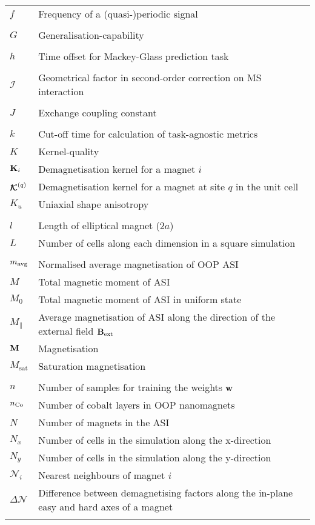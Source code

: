 \begin{longtable}[l]{p{60pt} p{350pt}}
	$f$ & Frequency of a (quasi-)periodic signal \\
	&\\

	$G$ & Generalisation-capability \\
	& \\

	$h$ & Time offset for Mackey-Glass prediction task \\
	&\\

	$\mathcal{I}$ & Geometrical factor in second-order correction on MS interaction \\
	&\\

	$J$ & Exchange coupling constant \\
	&\\

	$k$ & Cut-off time for calculation of task-agnostic metrics \\
	$K$ & Kernel-quality \\ %
	$\boldsymbol{\mathbf{K}}_i$ & Demagnetisation kernel for a magnet $i$ \\
	$\boldsymbol{\mathbf{\mathcal{K}}}^{(q)}$ & Demagnetisation kernel for a magnet at site $q$ in the unit cell \\
	$K_u$ & Uniaxial shape anisotropy \\
	&\\

	$l$ & Length of elliptical magnet ($2a$) \\
	$L$ & Number of cells along each dimension in a square simulation \\
	&\\

	$m_\mathrm{avg}$ & Normalised average magnetisation of OOP ASI \\
	$M$ & Total magnetic moment of ASI \\
	$M_0$ & Total magnetic moment of ASI in uniform state \\
	$M_\parallel$ & Average magnetisation of ASI along the direction of the external field $\boldsymbol{\mathbf{B}}_\mathrm{ext}$ \\
	$\boldsymbol{\mathbf{M}}$ & Magnetisation \\
	$M_\mathrm{sat}$ & Saturation magnetisation \\
	&\\

	$n$ & Number of samples for training the weights $\boldsymbol{\mathbf{w}}$ \\
	$n_{\ce{Co}}$ & Number of cobalt layers in OOP nanomagnets \\
	$N$ & Number of magnets in the ASI \\
	$N_x$ & Number of cells in the simulation along the x-direction \\
	$N_y$ & Number of cells in the simulation along the y-direction \\
	$\mathcal{N}_i$ & Nearest neighbours of magnet $i$ \\
	$\Delta \mathcal{N}$ & Difference between demagnetising factors along the in-plane easy and hard axes of a magnet \\
	&\\


\end{longtable}
